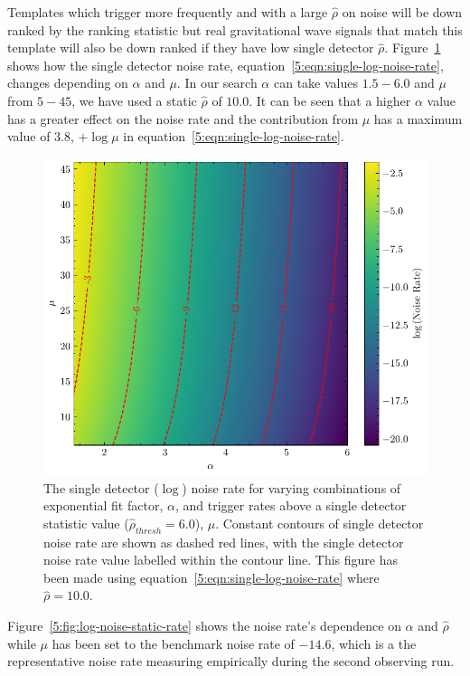 Templates which trigger more frequently and with a large $\hat{\rho}$ on noise will be down ranked by the ranking statistic but real gravitational wave signals that match this template will also be down ranked if they have low single detector $\hat{\rho}$. Figure~\ref{5:fig:log-noise-static-snr} shows how the single detector noise rate, equation~\ref{5:eqn:single-log-noise-rate}, changes depending on $\alpha$ and $\mu$. In our search $\alpha$ can take values $1.5 - 6.0$ and $\mu$ from $5 - 45$, we have used a static $\hat{\rho}$ of $10.0$. It can be seen that a higher $\alpha$ value has a greater effect on the noise rate and the contribution from $\mu$ has a maximum value of $3.8$, $ + \log\mu$ in equation~\ref{5:eqn:single-log-noise-rate}.
%
\begin{figure}
    \centering
    \includegraphics[width=1\textwidth]{images/5_pycbclive/high-noise-rate/lognoise_alpha_rate.pdf}
    \caption{The single detector ($\log$) noise rate for varying combinations of exponential fit factor, $\alpha$, and trigger rates above a single detector statistic value ($\hat{\rho}_{thresh} = 6.0$), $\mu$. Constant contours of single detector noise rate are shown as dashed red lines, with the single detector noise rate value labelled within the contour line. This figure has been made using equation~\ref{5:eqn:single-log-noise-rate} where $\hat{\rho} = 10.0$.}
    \label{5:fig:log-noise-static-snr}
\end{figure}
%
Figure~\ref{5:fig:log-noise-static-rate} shows the noise rate's dependence on $\alpha$ and $\hat{\rho}$ while $\mu$ has been set to the benchmark noise rate of $-14.6$, which is a the representative noise rate measuring empirically during the second observing run. 
